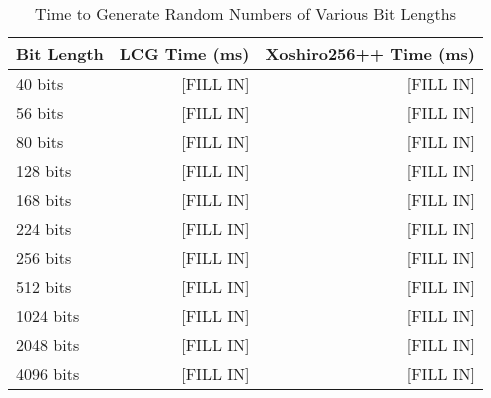 \begin{table}[H]
\centering
\caption{Time to Generate Random Numbers of Various Bit Lengths}
\label{tab:prng_perf}
\begin{tabular}{@{}lrr@{}}
\toprule
\textbf{Bit Length} & \textbf{LCG Time (ms)} & \textbf{Xoshiro256++ Time (ms)} \\
\midrule
40 bits     & [FILL IN] & [FILL IN] \\
56 bits     & [FILL IN] & [FILL IN] \\
80 bits     & [FILL IN] & [FILL IN] \\
128 bits    & [FILL IN] & [FILL IN] \\
168 bits    & [FILL IN] & [FILL IN] \\
224 bits    & [FILL IN] & [FILL IN] \\
256 bits    & [FILL IN] & [FILL IN] \\
512 bits    & [FILL IN] & [FILL IN] \\
1024 bits   & [FILL IN] & [FILL IN] \\
2048 bits   & [FILL IN] & [FILL IN] \\
4096 bits   & [FILL IN] & [FILL IN] \\
\bottomrule
\end{tabular}
\end{table} 
